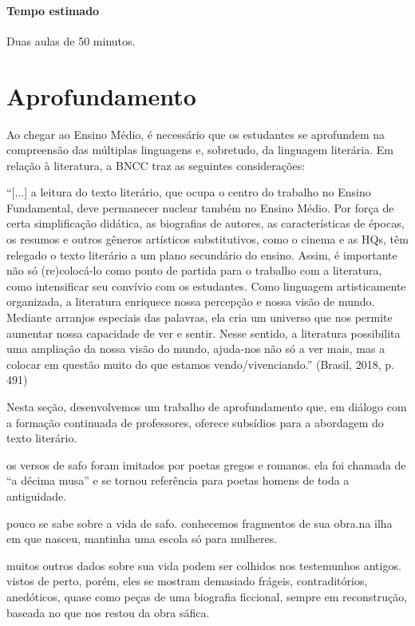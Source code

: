 \documentclass[12pt]{extarticle}
\begin{document}
\paragraph{Tempo estimado} Duas aulas de 50 minutos.




\section{Aprofundamento}


Ao chegar ao Ensino Médio, é necessário que os estudantes se aprofundem
na compreensão das múltiplas linguagens e, sobretudo, da linguagem
literária. Em relação à literatura, a BNCC traz as seguintes
considerações:

``{[}...{]} a leitura do texto literário, que ocupa o centro do trabalho
no Ensino Fundamental, deve permanecer nuclear também no Ensino Médio.
Por força de certa simplificação didática, as biografias de autores, as
características de épocas, os resumos e outros gêneros artísticos
substitutivos, como o cinema e as HQs, têm relegado o texto literário a
um plano secundário do ensino. Assim, é importante não só (re)colocá-lo
como ponto de partida para o trabalho com a literatura, como
intensificar seu convívio com os estudantes. Como linguagem
artisticamente organizada, a literatura enriquece nossa percepção e
nossa visão de mundo. Mediante arranjos especiais das palavras, ela cria
um universo que nos permite aumentar nossa capacidade de ver e sentir.
Nesse sentido, a literatura possibilita uma ampliação da nossa visão do
mundo, ajuda-nos não só a ver mais, mas a colocar em questão muito do
que estamos vendo/vivenciando.'' (Brasil, 2018, p. 491)

Nesta seção, desenvolvemos um trabalho de aprofundamento que, em diálogo
com a formação continuada de professores, oferece subsídios para a
abordagem do texto literário.

os versos de safo foram imitados por poetas gregos e romanos. ela foi
chamada de ``a décima musa'' e se tornou referência para poetas homens
de toda a antiguidade.

pouco se sabe sobre a vida de safo. conhecemos fragmentos de sua obra.na ilha em que nasceu, mantinha uma escola só para mulheres.

muitos outros dados sobre sua vida podem ser colhidos nos testemunhos
antigos. vistos de perto, porém, eles se mostram demasiado frágeis,
contraditórios, anedóticos, quase como peças de uma biografia ficcional,
sempre em reconstrução, baseada no que nos restou da obra sáfica.
\end{document}
